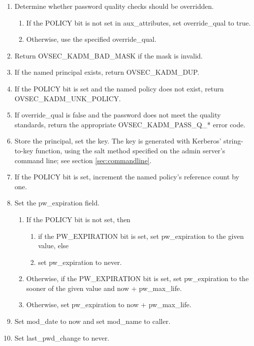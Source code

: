 \begin{enumerate}
\item Determine whether password quality checks should be overridden.
\begin{enumerate}
\item If the POLICY bit is not set in aux_attributes, set
override_qual to true.
\item Otherwise, use the specified override_qual.
\end{enumerate}

\item Return OVSEC_KADM_BAD_MASK if the mask is invalid.
\item If the named principal exists, return OVSEC_KADM_DUP.
\item If the POLICY bit is set and the named policy does not exist,
return OVSEC_KADM_UNK_POLICY.
\item If override_qual is false and the password does not meet the
quality standards, return the appropriate OVSEC_KADM_PASS_Q_* error
code.
\item Store the principal, set the key.  The key is generated with
Kerberos' string-to-key function, using the salt method specified on
the admin server's command line; see section \ref{sec:commandline}.
\item If the POLICY bit is set, increment the named policy's reference
count by one.

\item Set the pw_expiration field.
\begin{enumerate}
\item If the POLICY bit is not set, then
\begin{enumerate}
\item if the PW_EXPIRATION bit is set, set pw_expiration to the given
value, else
\item set pw_expiration to never.
\end{enumerate}
\item Otherwise, if the PW_EXPIRATION bit is set, set pw_expiration to
the sooner of the given value and now + pw_max_life.
\item Otherwise, set pw_expiration to now + pw_max_life.
\end{enumerate}

\item Set mod_date to now and set mod_name to caller.
\item Set last_pwd_change to never.
\end{enumerate}


